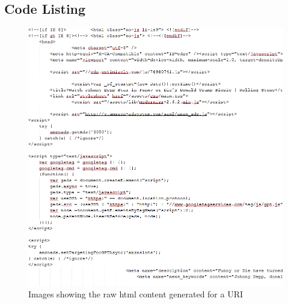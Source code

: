 \documentclass[letterpaper,11pt]{article}
\begin{document}
\subsection*{Code Listing} 

\begin{figure}
\includegraphics[scale=0.6]{sampleraw.png}
\caption{Images showing the raw html content generated for a URI}
\end{figure}
\end{document}
